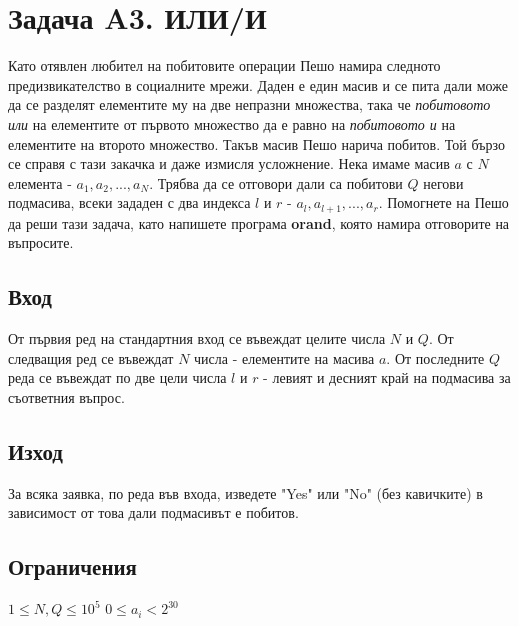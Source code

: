 \documentclass[12pt]{article}
\begin{document}
\section*{Задача A3. ИЛИ/И}

Като отявлен любител на побитовите операции Пешо намира следното предизвикателство в социалните мрежи. Даден е един масив и се пита дали може да се разделят елементите му на две непразни множества, така че \textit{побитовото или} на елементите от първото множество да е равно на \textit{побитовото и} на елементите на второто множество. Такъв масив Пешо нарича побитов. Той бързо се справя с тази закачка и даже измисля усложнение. Нека имаме масив $a$ с $N$ елемента - $a_1, a_2, ..., a_N$. Трябва да се отговори дали са побитови $Q$ негови подмасива, всеки зададен с два индекса $l$ и $r$ - $a_l, a_{l+1}, ..., a_r$. Помогнете на Пешо да реши тази задача, като напишете програма \textbf{orand}, която намира отговорите на въпросите.

\subsection*{Вход}

От първия ред на стандартния вход се въвеждат целите числа $N$ и $Q$. От следващия ред се въвеждат $N$ числа - елементите на масива $a$. От последните $Q$ реда се въвеждат по две цели числа $l$ и $r$ - левият и десният край на подмасива за съответния въпрос.

\subsection*{Изход}
За всяка заявка, по реда във входа, изведете "Yes" или "No" (без кавичките) в зависимост от това дали подмасивът е побитов.

\subsection*{Ограничения}
$1\leq N, Q\leq 10^5$\newline
\indent $0\leq a_i < 2^{30}$
\end{document}
